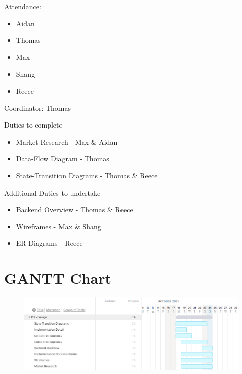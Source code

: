 \documentclass[a4paper,11pt]{report}
\begin{document}
\Large{Attendance:}
\normalsize

\begin{itemize}
    \item Aidan
    \item Thomas
    \item Max
    \item Shang
    \item Reece
\end{itemize}

Coordinator: Thomas

\vspace{1cm}

\Large{Duties to complete}
\normalsize
\begin{itemize}
    \item Market Research - Max \& Aidan
    \item Data-Flow Diagram - Thomas
    \item State-Transition Diagrams - Thomas \& Reece
\end{itemize}

\vspace{0.5cm}

\Large{Additional Duties to undertake}
\normalsize
\begin{itemize}
    \item Backend Overview - Thomas \& Reece
    \item Wireframes - Max \& Shang
    \item ER Diagrams - Reece
\end{itemize}

\chapter{GANTT Chart}
\begin{figure}[h]
    \includegraphics[width=\textwidth,keepaspectratio]{gantt.png}
\end{figure}
\end{document}
